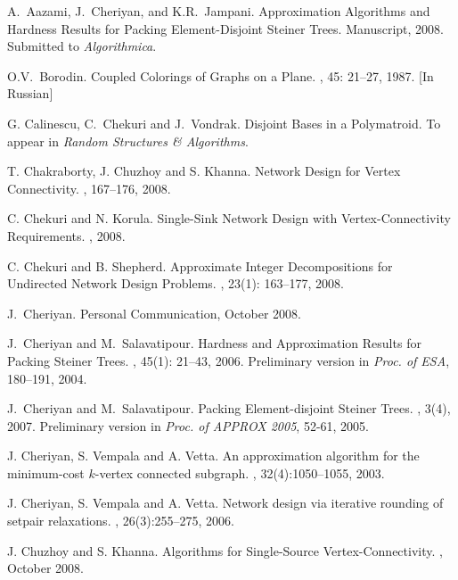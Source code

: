 \documentclass[11pt]{article}
\begin{document}
\begin{thebibliography}{55}
A.~Aazami, J.~Cheriyan, and K.R.~Jampani.
\newblock Approximation Algorithms and Hardness Results for Packing
Element-Disjoint Steiner Trees.
\newblock Manuscript, 2008. Submitted to {\em Algorithmica}.

O.V.~Borodin. 
\newblock Coupled Colorings of Graphs on a Plane.
, 45: 21--27, 1987. [In Russian]

G. Calinescu, C.~Chekuri and J.~Vondrak.
\newblock Disjoint Bases in a Polymatroid.
\newblock To appear in {\em Random Structures \& Algorithms}.

T. Chakraborty, J. Chuzhoy and S. Khanna.
\newblock Network Design for Vertex Connectivity.
, 167--176, 2008. 

C. Chekuri and N. Korula.
\newblock Single-Sink Network Design with Vertex-Connectivity
Requirements.
, 2008.

C. Chekuri and B. Shepherd.
\newblock Approximate Integer Decompositions for Undirected Network
Design Problems. 
, 23(1): 163--177, 2008.

J.~Cheriyan.
\newblock Personal Communication, October 2008.

J.~Cheriyan and M.~Salavatipour.
\newblock Hardness and Approximation Results for Packing Steiner Trees.
, 45(1): 21--43, 2006.
\newblock Preliminary version in {\em Proc. of ESA}, 180--191, 2004.

J.~Cheriyan and M.~Salavatipour.
\newblock Packing Element-disjoint Steiner Trees.
, 3(4), 2007.
\newblock Preliminary version in {\em Proc. of APPROX 2005}, 52-61, 2005.

J. Cheriyan, S. Vempala and A. Vetta.
\newblock An approximation algorithm for the minimum-cost $k$-vertex connected
subgraph.
, 32(4):1050--1055, 2003.

J. Cheriyan, S. Vempala and A. Vetta.
\newblock Network design via iterative rounding of setpair relaxations.
, 26(3):255--275, 2006.

J. Chuzhoy and S. Khanna.
\newblock Algorithms for Single-Source Vertex-Connectivity.
,  October 2008.


\end{thebibliography}
\end{document}
